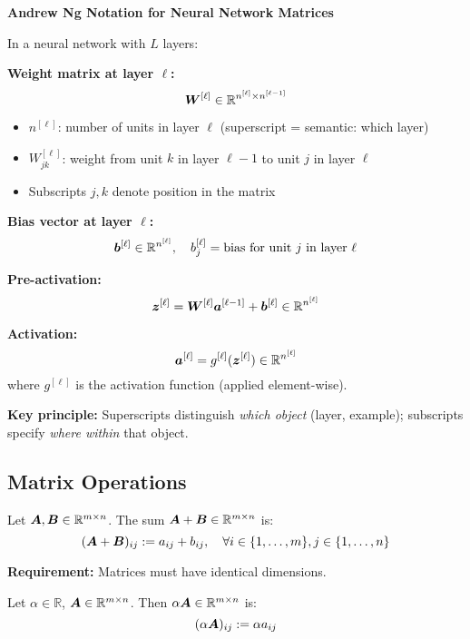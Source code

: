 \begin{notationbox}
    \textbf{Andrew Ng Notation for Neural Network Matrices}

    In a neural network with $L$ layers:

    \textbf{Weight matrix at layer $\ell$:}
    \[
        \bm{W}^{[\ell]} \in \mathbb{R}^{n^{[\ell]} \times n^{[\ell-1]}}
    \]
    \begin{itemize}
        \item $n^{[\ell]}$: number of units in layer $\ell$ (superscript = semantic: which layer)
        \item $W_{jk}^{[\ell]}$: weight from unit $k$ in layer $\ell-1$ to unit $j$ in layer $\ell$
        \item Subscripts $j, k$ denote position in the matrix
    \end{itemize}

    \textbf{Bias vector at layer $\ell$:}
    \[
        \bm{b}^{[\ell]} \in \mathbb{R}^{n^{[\ell]}}, \quad b_j^{[\ell]} = \text{bias for unit } j \text{ in layer } \ell
    \]

    \textbf{Pre-activation:}
    \[
        \bm{z}^{[\ell]} = \bm{W}^{[\ell]} \bm{a}^{[\ell-1]} + \bm{b}^{[\ell]} \in \mathbb{R}^{n^{[\ell]}}
    \]

    \textbf{Activation:}
    \[
        \bm{a}^{[\ell]} = g^{[\ell]}(\bm{z}^{[\ell]}) \in \mathbb{R}^{n^{[\ell]}}
    \]
    where $g^{[\ell]}$ is the activation function (applied element-wise).

    \textbf{Key principle:} Superscripts distinguish \textit{which object} (layer, example); subscripts specify \textit{where within} that object.
\end{notationbox}

\subsection{Matrix Operations}

\begin{definition}
    Let $\bm{A}, \bm{B} \in \mathbb{R}^{m \times n}$. The sum $\bm{A} + \bm{B} \in \mathbb{R}^{m \times n}$ is:
    \[
        (\bm{A} + \bm{B})_{ij} := a_{ij} + b_{ij}, \quad \forall i \in \{1, \ldots, m\}, j \in \{1, \ldots, n\}
    \]

    \textbf{Requirement:} Matrices must have identical dimensions.
\end{definition}

\begin{definition}
    Let $\alpha \in \mathbb{R}$, $\bm{A} \in \mathbb{R}^{m \times n}$. Then $\alpha\bm{A} \in \mathbb{R}^{m \times n}$ is:
    \[
        (\alpha\bm{A})_{ij} := \alpha a_{ij}
    \]
\end{definition}

